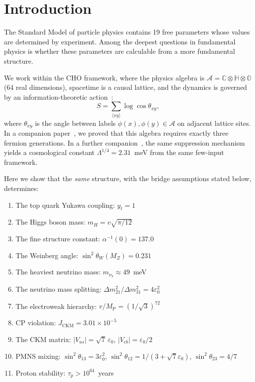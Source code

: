 \documentclass[12pt,a4paper]{article}
\theoremstyle{definition}
\theoremstyle{remark}
\newcommand{\Oct}{\mathbb{O}}
\newcommand{\Quat}{\mathbb{H}}
\newcommand{\Comp}{\mathbb{C}}
\newcommand{\Alg}{\mathcal{A}}
\newcommand{\MP}{M_{\mathrm{P}}}
\begin{document}
\section{Introduction}
\label{sec:intro}

The Standard Model of particle physics contains 19 free parameters whose 
values are determined by experiment. Among the deepest questions in 
fundamental physics is whether these parameters are calculable from a 
more fundamental structure.

We work within the CHO framework, where the physics algebra is 
$\Alg = \Comp\otimes\Quat\otimes\Oct$ (64 real dimensions), spacetime is a 
causal lattice, and the dynamics is governed by an information-theoretic 
action~\cite{Furey2016,Dixon1994,Boyle2020}:
\begin{equation}
S = \sum_{\langle xy \rangle} \log\cos\theta_{xy},
\label{eq:info-action}
\end{equation}
where $\theta_{xy}$ is the angle between labels $\phi(x), \phi(y) \in \Alg$ 
on adjacent lattice sites. In a companion paper~\cite{Paper1}, we proved that 
this algebra requires exactly three fermion generations. In a further 
companion~\cite{Paper3}, the same suppression mechanism yields a 
cosmological constant $\Lambda^{1/4} = 2.31$~meV from the same few-input 
framework.

Here we show that the \emph{same} structure, with the bridge assumptions stated below, 
determines:
\begin{enumerate}
\item The top quark Yukawa coupling: $y_t = 1$
\item The Higgs boson mass: $m_H = v\sqrt{\pi/12}$
\item The fine structure constant: $\alpha^{-1}(0) = 137.0$
\item The Weinberg angle: $\sin^2\theta_W(M_Z) = 0.231$
\item The heaviest neutrino mass: $m_{\nu_3} \approx 49$~meV
\item The neutrino mass splitting: $\Delta m^2_{21}/\Delta m^2_{31} = 4\varepsilon_0^2$
\item The electroweak hierarchy: $v/\MP = (1/\sqrt{3})^{72}$
\item CP violation: $J_{\text{CKM}} = 3.01\times 10^{-5}$
\item The CKM matrix: $|V_{us}| = \sqrt{7}\,\varepsilon_0$, $|V_{cb}| = \varepsilon_0/2$
\item PMNS mixing: $\sin^2\theta_{13} = 3\varepsilon_0^2$, 
      $\sin^2\theta_{12} = 1/(3{+}\sqrt{7}\varepsilon_0)$, $\sin^2\theta_{23} = 4/7$
\item Proton stability: $\tau_p > 10^{64}$~years
\end{enumerate}
\end{document}
